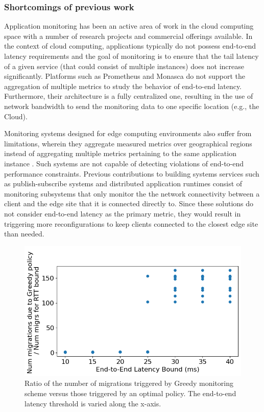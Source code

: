 \subsubsection{Shortcomings of previous work}
\par Application monitoring has been an active area of work in the cloud computing space with a number of research projects and commercial offerings available. In the context of cloud computing, applications typically do not possess end-to-end latency requirements and the goal of monitoring is to ensure that the tail latency of a given service (that could consist of multiple instances) does not increase significantly. Platforms such as Prometheus \cite{prometheus} and Monasca \cite{monasca} do not support the aggregation of multiple metrics to study the behavior of end-to-end latency. Furthermore, their architecture is a fully centralized one, resulting in the use of network bandwidth to send the monitoring data to one specific location (e.g., the Cloud).
\par Monitoring systems designed for edge computing environments also suffer from limitations, wherein they aggregate measured metrics over geographical regions instead of aggregating multiple metrics pertaining to the same application instance \cite{fmone, gonccalves2021dynamic}. Such systems are not capable of detecting violations of end-to-end performance constraints. Previous contributions to building systems services such as publish-subscribe systems \cite{emma} and distributed application runtimes \cite{foglets} consist of monitoring subsystems that only monitor the the network connectivity between a client and the edge site that it is connected directly to. Since these solutions do not consider end-to-end latency as the primary metric, they would result in triggering more reconfigurations to keep clients connected to the closest edge site than needed.
\begin{figure}
\centering
\includegraphics[width=0.75\linewidth]{figures/mechanisms/monitoring/migrations_count.png}
\caption{Ratio of the number of migrations triggered by Greedy monitoring scheme versus those triggered by an optimal policy. The end-to-end latency threshold is varied along the x-axis.}
\label{fig:migration_count}
\end{figure}
